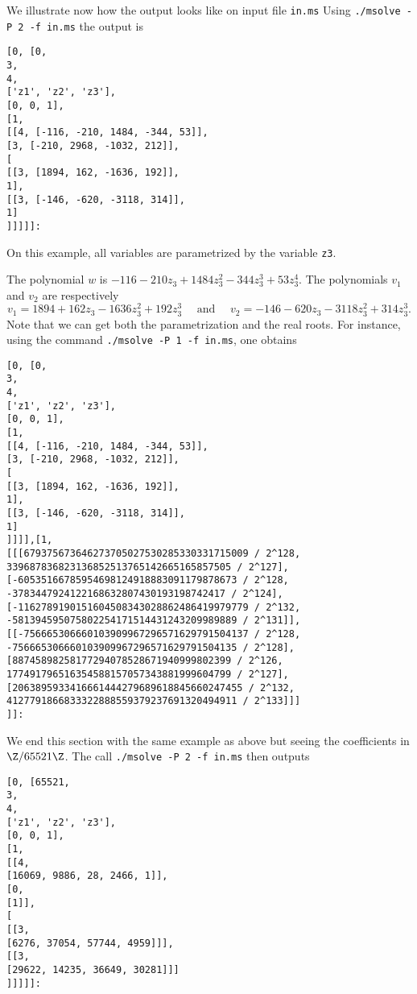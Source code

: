 \documentclass[a4paper,english,11pt]{scrartcl}
\theoremstyle{definition}
\theoremstyle{remark}
\begin{document}
We illustrate now how the output looks like on input file \verb+in.ms+
Using \verb+./msolve -P 2 -f in.ms+ the output is 
\begin{tcolorbox} %
  \begin{lstlisting}
[0, [0, 
3, 
4, 
['z1', 'z2', 'z3'],
[0, 0, 1],
[1,
[[4, [-116, -210, 1484, -344, 53]],
[3, [-210, 2968, -1032, 212]],
[
[[3, [1894, 162, -1636, 192]],
1],
[[3, [-146, -620, -3118, 314]],
1]
]]]]]:
  \end{lstlisting}
\end{tcolorbox}
On this example, all variables are parametrized by the variable \verb+z3+. 

The polynomial $w$ is $-116 - 210 z_3 + 1484 z_3^2 -344 z_3^3 + 53 z_3^4$. 
The polynomials $v_1$ and $v_2$ are respectively 
\[
    v_1 = 1894 + 162 z_3 - 1636 z_3^2 + 192 z_3^3 \quad \text{ and } 
    \quad v_2 = -146 -620 z_3 - 3118 z_3^2 + 314 z_3^3.
\]
Note that we can get both the parametrization and the real roots.
For instance, using the command 
\verb+./msolve -P 1 -f in.ms+, one obtains
\begin{tcolorbox} %
  \begin{lstlisting}
[0, [0, 
3, 
4, 
['z1', 'z2', 'z3'],
[0, 0, 1],
[1,
[[4, [-116, -210, 1484, -344, 53]],
[3, [-210, 2968, -1032, 212]],
[
[[3, [1894, 162, -1636, 192]],
1],
[[3, [-146, -620, -3118, 314]],
1]
]]]],[1,
[[[679375673646273705027530285330331715009 / 2^128, 339687836823136852513765142665165857505 / 2^127], [-60535166785954698124918883091179878673 / 2^128, -3783447924122168632807430193198742417 / 2^124], [-1162789190151604508343028862486419979779 / 2^132, -581394595075802254171514431243209989889 / 2^131]], [[-756665306660103909967296571629791504137 / 2^128, -756665306660103909967296571629791504135 / 2^128], [88745898258177294078528671940999802399 / 2^126, 177491796516354588157057343881999604799 / 2^127], [2063895933416661444279689618845660247455 / 2^132, 4127791866833322888559379237691320494911 / 2^133]]]
]]:
  \end{lstlisting}
\end{tcolorbox}

We end this section with the same example as above but seeing the coefficients in 
\(\Z/65521\Z\).
The call \verb+./msolve -P 2 -f in.ms+ then outputs
\begin{tcolorbox} %
  \begin{lstlisting}
[0, [65521, 
3, 
4, 
['z1', 'z2', 'z3'],
[0, 0, 1],
[1,
[[4,
[16069, 9886, 28, 2466, 1]],
[0,
[1]],
[
[[3,
[6276, 37054, 57744, 4959]]],
[[3,
[29622, 14235, 36649, 30281]]]
]]]]]:
  \end{lstlisting}
\end{tcolorbox}
\end{document}
